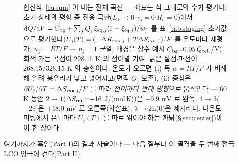 \begin{figure}[t]
\caption{합산식~\eqref{eq:sum} 이 내는 전체 곡선 --- 좌표는 식 그대로의 수치 평가다: 초기 상태의 평형
종 전용 극한($L_V\!\to\!0$$\cdot$$\gamma_j{=}0$$\cdot$$R_n{=}0$)에서
$\mathrm{d} Q/\mathrm{d} V=C_{\mathrm{bg}}+\sum_jQ_j\,\xi_{\mathrm{eq},j}(1-\xi_{\mathrm{eq},j})/w_j$ 를 표~\ref{tab:staging} 초기값으로
평가했다($U_j(T)=(-\Delta H_{\mathrm{rxn},j}+T\Delta S_{\mathrm{rxn},j})/F$ 를 온도마다 재평가, $w_j{=}RT/F$
--- $n_j{=}1$ 균일, 배경은 상수 예시 $C_{\mathrm{bg}}{=}0.05\,Q_{\mathrm{cell}}$/V). 회색 가는 곡선이 $298.15$ K 의
전이별 기여, 굵은 실선$\cdot$파선이 $268.15/328.15$ K 의 총합이다. 온도가 오르면 (i) 폭
$w{=}RT/F$ 가 비례해 열려 봉우리가 낮고 넓어지고(면적 $Q_j$ 보존), (ii) 중심은
$\partial U_j/\partial T=\Delta S_{\mathrm{rxn},j}/F$ 를 따라 \emph{전이마다 반대 방향}으로 움직인다 ---
$60$ K 동안 $2\!\to\!1$($\Delta S_{\mathrm{rxn}}{=}{-}16$ J/(mol\,K))은 $-9.9$ mV 로 왼쪽,
$4\!\to\!3$($+29$)은 $+18.0$ mV 로 오른쪽(화살표), $3\!\to\!2\mathrm L$($0$)은 제자리다. 다온도
피팅에서 온도마다 $U_j(T)$ 를 따로 읽어야 하는 까닭(\S\ref{sec:center})이 이 한 장이다.}
\label{fig:sumcurve}
\end{figure}

여기까지가 흑연(Part I)의 결과 사슬이다 --- 다음 절부터 이 골격을 두 번째 전극 LCO 양극에 건다(Part II).

